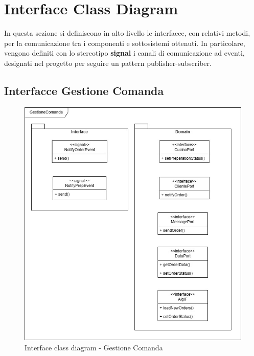 \section{Interface Class Diagram}
In questa sezione si definiscono in alto livello le interfacce, con relativi metodi, per la comunicazione tra i componenti e sottosistemi ottenuti. In particolare, vengono definiti con lo stereotipo \textbf{signal} i canali di comunicazione ad eventi, designati nel progetto per seguire un pattern publisher-subscriber.

\subsection{Interfacce Gestione Comanda}
\begin{figure}[H]
	\centering
	\includegraphics[scale=0.5]{iterazione1/images/GestioneComanda interface UML.jpg}
	\caption{Interface class diagram - Gestione Comanda\label{fig:interface_class_diagram_gestione_comanda}}
\end{figure}

